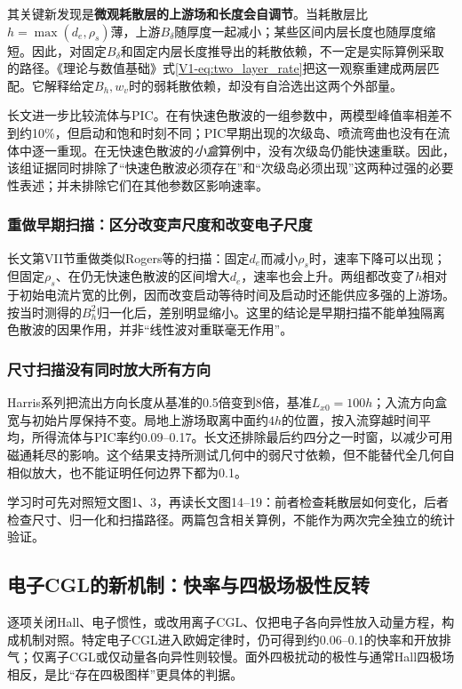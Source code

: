 \documentclass[UTF8,a4paper,11pt,openany,fontset=fandol]{ctexbook}
\begin{document}
其关键新发现是\textbf{微观耗散层的上游场和长度会自调节}。当耗散层比$h=\max(d_e,\rho_s)$薄，上游$B_\delta$随厚度一起减小；某些区间内层长度也随厚度缩短。因此，对固定$B_\delta$和固定内层长度推导出的耗散依赖，不一定是实际算例采取的路径。《理论与数值基础》式\eqref{V1-eq:two_layer_rate}把这一观察重建成两层匹配。它解释给定$B_h,w_v$时的弱耗散依赖，却没有自洽选出这两个外部量。

长文\citet{L217}进一步比较流体与PIC。在有快速色散波的一组参数中，两模型峰值率相差不到约10\%，但启动和饱和时刻不同；PIC早期出现的次级岛、喷流弯曲也没有在流体中逐一重现。在无快速色散波的\emph{小盒}算例中，没有次级岛仍能快速重联。因此，该组证据同时排除了“快速色散波必须存在”和“次级岛必须出现”这两种过强的必要性表述；并未排除它们在其他参数区影响速率。

\subsubsection{重做早期扫描：区分改变声尺度和改变电子尺度}
长文第VII节重做类似Rogers等的扫描：固定$d_e$而减小$\rho_s$时，速率下降可以出现；但固定$\rho_s$、在仍无快速色散波的区间增大$d_e$，速率也会上升。两组都改变了$h$相对于初始电流片宽的比例，因而改变启动等待时间及启动时还能供应多强的上游场。按当时测得的$B_h^2$归一化后，差别明显缩小。这里的结论是早期扫描不能单独隔离色散波的因果作用，并非“线性波对重联毫无作用”。\citep{Rogers2001,L217}

\subsubsection{尺寸扫描没有同时放大所有方向}
Harris系列把流出方向长度从基准的0.5倍变到8倍，基准$L_{x0}=100h$；入流方向盒宽与初始片厚保持不变。局地上游场取离中面约$4h$的位置，按入流穿越时间平均，所得流体与PIC率约0.09--0.17。长文还排除最后约四分之一时窗，以减少可用磁通耗尽的影响。这个结果支持所测试几何中的弱尺寸依赖，但不能替代全几何自相似放大，也不能证明任何边界下都为0.1。

学习时可先对照短文图1、3，再读长文图14--19：前者检查耗散层如何变化，后者检查尺寸、归一化和扫描路径。两篇包含相关算例，不能作为两次完全独立的统计验证。\citep{L216,L217}

\subsection{电子CGL的新机制：快率与四极场极性反转}
\citet{Cassak2015}逐项关闭Hall、电子惯性，或改用离子CGL、仅把电子各向异性放入动量方程，构成机制对照。特定电子CGL进入欧姆定律时，仍可得到约0.06--0.1的快率和开放排气；仅离子CGL或仅动量各向异性则较慢。面外四极扰动的极性与通常Hall四极场相反，是比“存在四极图样”更具体的判据。
\end{document}
